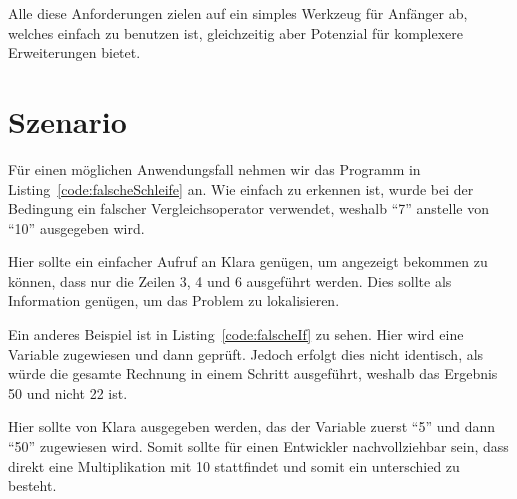 Alle diese Anforderungen zielen auf ein simples Werkzeug für Anfänger ab, welches einfach zu benutzen ist, gleichzeitig aber Potenzial für komplexere Erweiterungen bietet.

\section{Szenario} 

Für einen möglichen Anwendungsfall nehmen wir das Programm in Listing~\ref{code:falscheSchleife} an. Wie einfach zu erkennen ist, wurde bei der Bedingung ein falscher Vergleichsoperator verwendet, weshalb "`7"' anstelle von "`10"' ausgegeben wird.



Hier sollte ein einfacher Aufruf an Klara genügen, um angezeigt bekommen zu können, dass nur die Zeilen 3, 4 und 6 ausgeführt werden. Dies sollte als Information genügen, um das Problem zu lokalisieren.

Ein anderes Beispiel ist in Listing~\ref{code:falscheIf} zu sehen. Hier wird eine Variable zugewiesen und dann geprüft. Jedoch erfolgt dies nicht identisch, als würde die gesamte Rechnung in einem Schritt ausgeführt, weshalb das Ergebnis 50 und nicht 22 ist.



Hier sollte von Klara ausgegeben werden, das der Variable  zuerst "`5"' und dann "`50"' zugewiesen wird. Somit sollte für einen Entwickler nachvollziehbar sein, dass direkt eine Multiplikation mit 10 stattfindet und somit ein unterschied zu  besteht.